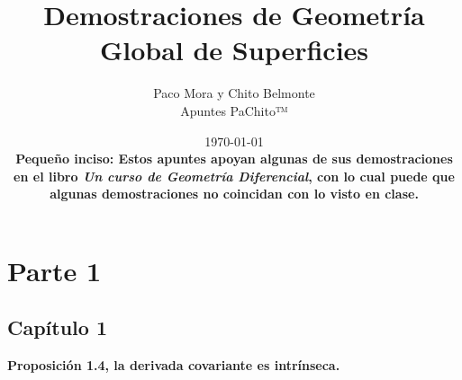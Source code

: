 \documentclass[openany]{book}
\title{Demostraciones de Geometría Global de Superficies}
\author{Paco Mora y Chito Belmonte\\Apuntes PaChito™}
\date{\today\\ \vspace{1cm}
\textbf{Pequeño inciso: Estos apuntes apoyan algunas de sus demostraciones en el libro \textit{Un curso de Geometría Diferencial}, con lo cual puede que algunas demostraciones no coincidan con lo visto en clase.}}
\begin{document}
\maketitle
\tableofcontents

\part{Parte 1}

\chapter{Capítulo 1}

\begin{center}
\textbf{Proposición 1.4, la derivada covariante es intrínseca.}
\end{center}
\end{document}
